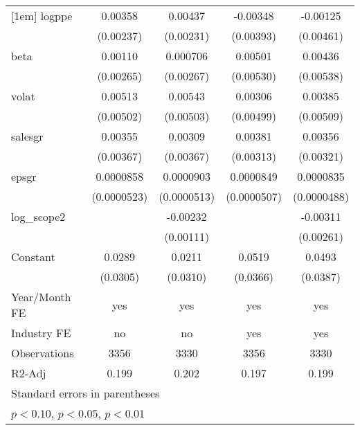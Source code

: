 \begin{table}[htbp]
\begin{tabular}{l*{4}{c}}
[1em]
logppe              &     0.00358         &     0.00437\sym{*}  &    -0.00348         &    -0.00125         \\
                    &   (0.00237)         &   (0.00231)         &   (0.00393)         &   (0.00461)         \\
[1em]
beta                &     0.00110         &    0.000706         &     0.00501         &     0.00436         \\
                    &   (0.00265)         &   (0.00267)         &   (0.00530)         &   (0.00538)         \\
[1em]
volat               &     0.00513         &     0.00543         &     0.00306         &     0.00385         \\
                    &   (0.00502)         &   (0.00503)         &   (0.00499)         &   (0.00509)         \\
[1em]
salesgr             &     0.00355         &     0.00309         &     0.00381         &     0.00356         \\
                    &   (0.00367)         &   (0.00367)         &   (0.00313)         &   (0.00321)         \\
[1em]
epsgr               &   0.0000858         &   0.0000903\sym{*}  &   0.0000849\sym{*}  &   0.0000835\sym{*}  \\
                    & (0.0000523)         & (0.0000513)         & (0.0000507)         & (0.0000488)         \\
[1em]
log\_scope2          &                     &    -0.00232\sym{**} &                     &    -0.00311         \\
                    &                     &   (0.00111)         &                     &   (0.00261)         \\
[1em]
Constant            &      0.0289         &      0.0211         &      0.0519         &      0.0493         \\
                    &    (0.0305)         &    (0.0310)         &    (0.0366)         &    (0.0387)         \\
\hline
Year/Month FE       &         yes         &         yes         &         yes         &         yes         \\
Industry FE         &          no         &          no         &         yes         &         yes         \\
Observations        &        3356         &        3330         &        3356         &        3330         \\
R2-Adj              &       0.199         &       0.202         &       0.197         &       0.199         \\
\hline\hline
\multicolumn{5}{l}{\footnotesize Standard errors in parentheses}\\
\multicolumn{5}{l}{\footnotesize \sym{*} \(p<0.10\), \sym{**} \(p<0.05\), \sym{***} \(p<0.01\)}\\
\end{tabular}
\end{table}

